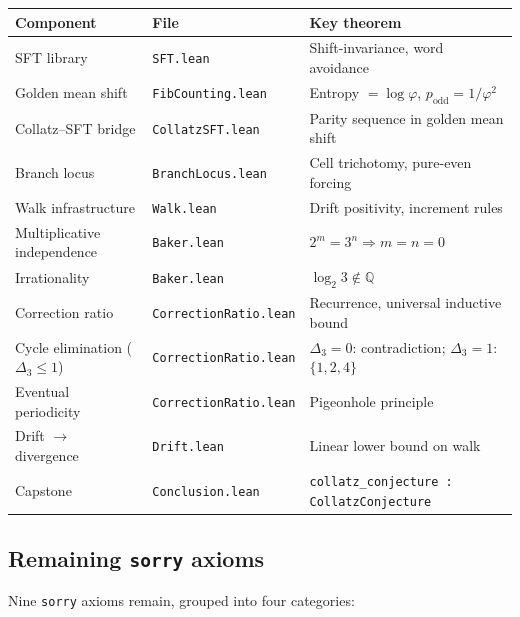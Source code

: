 \documentclass[manuscript]{aomart}
\newcommand{\Q}{\mathbb{Q}}
\theoremstyle{plain}
\theoremstyle{definition}
\theoremstyle{remark}
\numberwithin{equation}{section}
\begin{document}
\begin{center}
\renewcommand{\arraystretch}{1.3}
\begin{tabular}{lll}
  \toprule
  \textbf{Component} & \textbf{File} & \textbf{Key theorem} \\
  \midrule
  SFT library & \texttt{SFT.lean} &
    Shift-invariance, word avoidance \\
  Golden mean shift & \texttt{FibCounting.lean} &
    Entropy $= \log\varphi$, $p_{\mathrm{odd}} = 1/\varphi^2$ \\
  Collatz--SFT bridge & \texttt{CollatzSFT.lean} &
    Parity sequence in golden mean shift \\
  Branch locus & \texttt{BranchLocus.lean} &
    Cell trichotomy, pure-even forcing \\
  Walk infrastructure & \texttt{Walk.lean} &
    Drift positivity, increment rules \\
  Multiplicative independence & \texttt{Baker.lean} &
    $2^m = 3^n \Rightarrow m = n = 0$ \\
  Irrationality & \texttt{Baker.lean} &
    $\log_2 3 \notin \Q$ \\
  Correction ratio & \texttt{CorrectionRatio.lean} &
    Recurrence, universal inductive bound \\
  Cycle elimination ($\Delta_3 \le 1$) & \texttt{CorrectionRatio.lean} &
    $\Delta_3 = 0$: contradiction; $\Delta_3 = 1$: $\{1,2,4\}$ \\
  Eventual periodicity & \texttt{CorrectionRatio.lean} &
    Pigeonhole principle \\
  Drift $\to$ divergence & \texttt{Drift.lean} &
    Linear lower bound on walk \\
  Capstone & \texttt{Conclusion.lean} &
    \texttt{collatz\_conjecture : CollatzConjecture} \\
  \bottomrule
\end{tabular}
\end{center}

\subsection{Remaining \texttt{sorry} axioms}

Nine \texttt{sorry} axioms remain, grouped into four categories:
\end{document}

